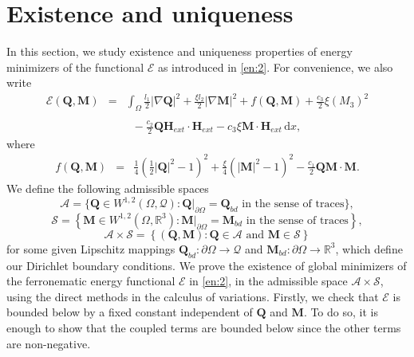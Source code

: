 \documentclass{article}
\def\Qvec{\mathbf{Q}}
\def \Mvec{\mathbf{M}}
\def\Hvec{\mathbf{H}}
\def\d{\mathrm{d}}
\begin{document}
\section{Existence and uniqueness}\label{sec:4}
In this section, we study existence and uniqueness properties of energy minimizers of the functional $\mathcal{E}$ as introduced in \eqref{en:2}. 
For convenience, we also write 
\begin{eqnarray}
\mathcal{E}\left(\Qvec, \Mvec\right)&=&\int_{\Omega}\frac{l_1}{2}|\nabla \Qvec|^2 + \frac{\xi l_2}{2}|\nabla \Mvec|^2  + f\left(\Qvec, \Mvec\right)
+ \frac{c_3}{2}\xi\left(M_3\right)^2
\nonumber\\\nonumber\\
&& \;\;- \frac{c_2}{2}\Qvec\Hvec_{ext}\cdot\Hvec_{ext} 
- c_3\xi\Mvec\cdot\Hvec_{ext} \,\d x,\nonumber
\end{eqnarray}
where
\begin{eqnarray} \label{def-f}
f\left(\Qvec, \Mvec\right)&=&  \frac{1}{4}\left(\frac{1}{2}|\Qvec|^2 - 1\right)^2 + \frac{\xi}{4}\left(|\Mvec|^2 - 1\right)^2 -  \frac{c_1}{2}\Qvec\Mvec\cdot\Mvec.
\end{eqnarray}
We define the following admissible spaces
\begin{displaymath}
\mathcal{A} = \Big \{ \Qvec \in W^{1,2} \left(\Omega, \mathcal{Q}\right):  \Qvec|_{\partial \Omega} = \Qvec_{bd} \mbox{ in the sense of traces}\Big \},
\end{displaymath}
\begin{displaymath}
\mathcal{S} = \left \{ \Mvec \in W^{1,2} \left( \Omega, \mathbb R^3 \right) : \Mvec|_{\partial \Omega} = \Mvec_{bd} \mbox{ in the sense of traces}\right \},
\end{displaymath}
\begin{displaymath}
\mathcal{A}\times\mathcal{S} = \left \{ \left(\Qvec, \Mvec\right) : \Qvec \in \mathcal{A} \mbox{ and } \Mvec \in \mathcal{S} \right \}
\end{displaymath}
for some given Lipschitz mappings $\Qvec_{bd}: \partial\Omega\rightarrow\mathcal{Q}$ and $\Mvec_{bd}: \partial\Omega\rightarrow\mathbb R^3$, which define our Dirichlet boundary conditions.
We prove the existence of global minimizers of the ferronematic energy functional $\mathcal{E}$ in \eqref{en:2}, in the admissible space $\mathcal{A} \times \mathcal{S}$, using the direct methods in the calculus of variations. Firstly, we check that $\mathcal{E}$ is bounded below by a fixed constant independent of $\Qvec$ and $\Mvec$. To do so, it is enough to show that the coupled terms are bounded below since the other terms are non-negative. 
\end{document}
